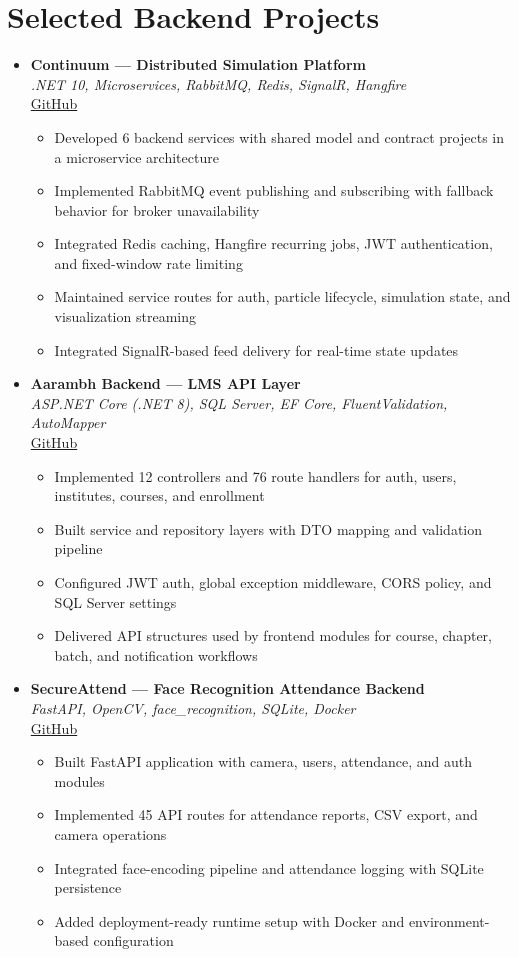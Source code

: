\documentclass[11pt,a4paper]{article}
\newcommand{\resumeItem}[1]{
  \item\small{#1 \vspace{-1pt}}
}
\begin{document}
\section{Selected Backend Projects}
\begin{itemize}[leftmargin=*]

\item \textbf{Continuum --- Distributed Simulation Platform} \\
\textit{.NET 10, Microservices, RabbitMQ, Redis, SignalR, Hangfire} \\
\href{https://github.com/Dhairya3391/continuum}{GitHub}
\begin{itemize}[leftmargin=*]
  \resumeItem{Developed 6 backend services with shared model and contract projects in a microservice architecture}
  \resumeItem{Implemented RabbitMQ event publishing and subscribing with fallback behavior for broker unavailability}
  \resumeItem{Integrated Redis caching, Hangfire recurring jobs, JWT authentication, and fixed-window rate limiting}
  \resumeItem{Maintained service routes for auth, particle lifecycle, simulation state, and visualization streaming}
  \resumeItem{Integrated SignalR-based feed delivery for real-time state updates}
\end{itemize}

\item \textbf{Aarambh Backend --- LMS API Layer} \\
\textit{ASP.NET Core (.NET 8), SQL Server, EF Core, FluentValidation, AutoMapper} \\
\href{https://github.com/Dhairya3391/Aarambh}{GitHub}
\begin{itemize}[leftmargin=*]
  \resumeItem{Implemented 12 controllers and 76 route handlers for auth, users, institutes, courses, and enrollment}
  \resumeItem{Built service and repository layers with DTO mapping and validation pipeline}
  \resumeItem{Configured JWT auth, global exception middleware, CORS policy, and SQL Server settings}
  \resumeItem{Delivered API structures used by frontend modules for course, chapter, batch, and notification workflows}
\end{itemize}

\item \textbf{SecureAttend --- Face Recognition Attendance Backend} \\
\textit{FastAPI, OpenCV, face\_recognition, SQLite, Docker} \\
\href{https://github.com/Dhairya3391/SecureAttend}{GitHub}
\begin{itemize}[leftmargin=*]
  \resumeItem{Built FastAPI application with camera, users, attendance, and auth modules}
  \resumeItem{Implemented 45 API routes for attendance reports, CSV export, and camera operations}
  \resumeItem{Integrated face-encoding pipeline and attendance logging with SQLite persistence}
  \resumeItem{Added deployment-ready runtime setup with Docker and environment-based configuration}
\end{itemize}


\end{itemize}
\end{document}
